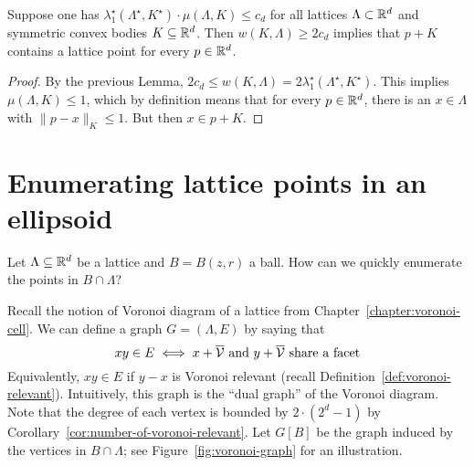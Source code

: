 \begin{lemma}
  Suppose one has $\lambda_1^\star(\Lambda^\star, K^\star) \cdot \mu(\Lambda, K) \leq c_d$
  for all lattices $\Lambda \subset \mathbb{R}^d$ and symmetric convex bodies $K \subseteq \mathbb{R}^d$.
  Then $w(K,\Lambda) \geq 2c_d$ implies that $p + K$ contains a lattice point for every $p \in \mathbb{R}^d$.
\end{lemma}
\begin{proof}
  By the previous Lemma, $2c_d \leq w(K,\Lambda) = 2 \lambda_1^\star(\Lambda^\star, K^\star)$.
  This implies $\mu(\Lambda, K) \leq 1$,
  which by definition means that for every $p \in \mathbb{R}^d$,
  there is an $x \in \Lambda$ with $\|p - x\|_K \leq 1$.
  But then $x \in p + K$.
\end{proof}





\section{Enumerating lattice points in an ellipsoid}

Let $\Lambda \subseteq \mathbb{R}^d$ be a lattice and $B = B(z,r)$ a ball.
How can we quickly enumerate the points in $B \cap \Lambda$?

Recall the notion of Voronoi diagram of a lattice from Chapter~\ref{chapter:voronoi-cell}.
We can define a graph $G = (\Lambda, E)$ by saying that
\[
  xy \in E \iff x + \overline{\mathcal{V}} \text{ and } y + \overline{\mathcal{V}} \text{ share a facet}
\]
Equivalently, $xy \in E$ if $y - x$ is Voronoi relevant
(recall Definition~\ref{def:voronoi-relevant}).
Intuitively, this graph is the ``dual graph'' of the Voronoi diagram.
Note that the degree of each vertex is bounded by $2\cdot (2^d - 1)$
by Corollary~\ref{cor:number-of-voronoi-relevant}.
Let $G[B]$ be the graph induced by the vertices in $B \cap \Lambda$;
see Figure~\ref{fig:voronoi-graph} for an illustration.

